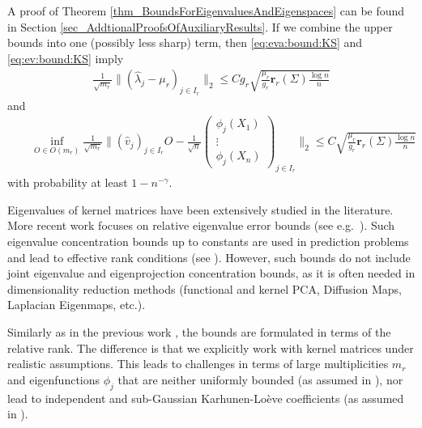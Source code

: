 \documentclass[a4paper,11pt]{article} %
\numberwithin{equation}{section}
\theoremstyle{definition}
\theoremstyle{remark}
\theoremstyle{plain}
\begin{document}
\noindent A proof of Theorem \ref{thm_BoundsForEigenvaluesAndEigenspaces} can be found in Section \ref{sec_AddtionalProofsOfAuxiliaryResults}.
If we combine the upper bounds into one (possibly less sharp) term, then \eqref{eq:eva:bound:KS} and \eqref{eq:ev:bound:KS} imply 
\begin{align}
    \frac{1}{\sqrt{m_r}} \big\| (\widehat{\lambda}_j-\mu_r)_{j \in I_r} \big\|_2
    \le
    C g_r\sqrt{ \frac{\mu_r}{g_{r}}\mathbf{r}_{r}(\Sigma) \frac{\log n}{n} }
  \end{align}
  and
  \begin{align}
    & \ \ \ \
    \inf_{O \in O(m_r)} 
    \frac{1}{ \sqrt{m_r} } \Bigg\| (\widehat v_j)_{j \in I_r}O - \frac{1}{\sqrt{n}}
                                                                \begin{pmatrix}
                                                                  \phi_j(X_1) \\
                                                                  \vdots      \\
                                                                  \phi_j(X_n) 
                                                                \end{pmatrix}_{j \in I_r} 
                           \Bigg\|_2
    \le 
    C \sqrt{ \frac{\mu_r}{g_{r}} \mathbf{r}_{r}(\Sigma) \frac{\log n}{n} }
  \end{align}
  with probability at least \( 1 - n^{-\gamma} \).

Eigenvalues of kernel matrices have been extensively studied in the literature. More recent work focuses on relative eigenvalue error bounds (see e.g.~\cite{MR2274441,pmlr-v99-ostrovskii19a,BarzilaiShamir}). Such eigenvalue concentration bounds up to constants are used in prediction problems and lead to effective rank conditions (see \cite{MR4263288,MR4652993}). However, such bounds do not include joint eigenvalue and eigenprojection concentration bounds, as it is often needed in dimensionality reduction methods (functional and kernel PCA, Diffusion Maps, Laplacian Eigenmaps, etc.).


Similarly as in the previous work \cite{JirakWahl2018PerturbationBoundsUnderRelativeGap,JirakWahl2023RelativePerturbationBounds,Wahl2026PertubationExpansionsI}, the bounds are formulated in terms of the relative rank. The difference is that we explicitly work with kernel matrices under realistic assumptions. This leads to challenges in terms of large multiplicities $m_r$ and eigenfunctions $\phi_j$ that are neither uniformly bounded (as assumed in \cite{JirakWahl2018PerturbationBoundsUnderRelativeGap,JirakWahl2023RelativePerturbationBounds}), nor lead to independent and sub-Gaussian Karhunen-Loève coefficients (as assumed in \cite{Wahl2026PertubationExpansionsI}).
\end{document}
